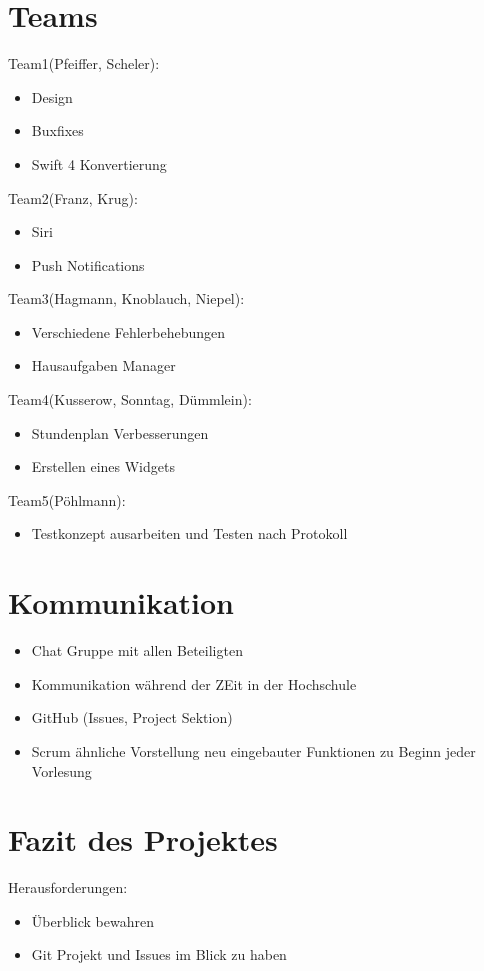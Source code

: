 \section{Teams}

Team1(Pfeiffer, Scheler):
\begin{itemize}
\item Design
\item Buxfixes
\item Swift 4 Konvertierung
\end{itemize}


Team2(Franz, Krug):
\begin{itemize}
\item Siri
\item Push Notifications
\end{itemize}


Team3(Hagmann, Knoblauch, Niepel):
\begin{itemize}
\item Verschiedene Fehlerbehebungen
\item Hausaufgaben Manager
\end{itemize}


Team4(Kusserow, Sonntag, Dümmlein):
\begin{itemize}
\item Stundenplan Verbesserungen


\item Erstellen eines Widgets
\end{itemize}


Team5(Pöhlmann):
\begin{itemize}
\item Testkonzept ausarbeiten und Testen nach Protokoll
\end{itemize}


\section{Kommunikation}
\begin{itemize}
\item Chat Gruppe mit allen Beteiligten
\item Kommunikation während der ZEit in der Hochschule
\item GitHub (Issues, Project Sektion)
\item Scrum ähnliche Vorstellung neu eingebauter Funktionen zu Beginn jeder Vorlesung
\end{itemize}


\section{Fazit des Projektes}
Herausforderungen:
\begin{itemize}
\item Überblick bewahren
\item Git Projekt und Issues im Blick zu haben
\end{itemize}



